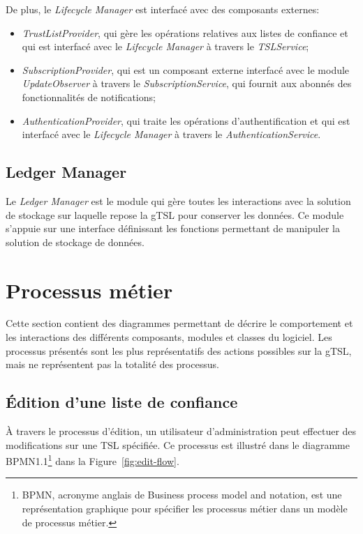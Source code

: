 \documentclass{tnreport}
\begin{document}
De plus, le \textit{Lifecycle Manager} est interfacé avec des composants externes:
\begin{itemize}
	\item \textit{TrustListProvider}, qui gère les opérations relatives aux listes de confiance et qui est interfacé avec le \textit{Lifecycle Manager} à travers le \textit{TSLService};
	\item \textit{SubscriptionProvider}, qui est un composant externe interfacé avec le module \textit{UpdateObserver} à travers le \textit{SubscriptionService}, qui fournit aux abonnés des fonctionnalités de notifications;
	\item \textit{AuthenticationProvider}, qui traite les opérations d'authentification et qui est interfacé avec le \textit{Lifecycle Manager} à travers le \textit{AuthenticationService}.
\end{itemize}

\subsection{Ledger Manager}

Le\textit{ Ledger Manager} est le module qui gère toutes les interactions avec la solution de stockage sur laquelle repose la gTSL pour conserver les données. Ce module s'appuie sur une interface définissant les fonctions permettant de manipuler la solution de stockage de données.

\section{Processus métier}

Cette section contient des diagrammes permettant de décrire le comportement et les interactions des différents composants, modules et classes du logiciel. Les processus présentés sont les plus représentatifs des actions possibles sur la gTSL, mais ne représentent pas la totalité des processus.

\subsection{Édition d'une liste de confiance}

À travers le processus d'édition, un utilisateur d'administration peut effectuer des modifications sur une TSL spécifiée.
Ce processus est illustré dans le diagramme BPMN1.1\footnote{BPMN, acronyme anglais de Business process model and notation, est une représentation graphique pour spécifier les processus métier dans un modèle de processus métier.} dans la Figure~\ref{fig:edit-flow}.
\end{document}
